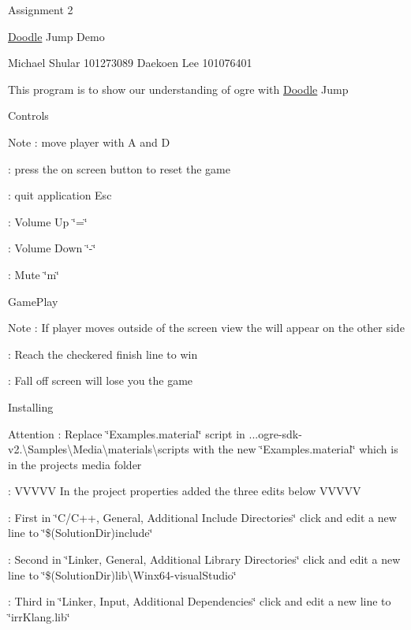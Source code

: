 Assignment 2

\mbox{\hyperlink{class_doodle}{Doodle}} Jump Demo

Michael Shular 101273089 Daekoen Lee 101076401

This program is to show our understanding of ogre with \mbox{\hyperlink{class_doodle}{Doodle}} Jump

Controls \begin{DoxyNote}{Note}
\+: move player with A and D 

\+: press the on screen button to reset the game 

\+: quit application Esc 

\+: Volume Up \char`\"{}=\char`\"{} 

\+: Volume Down \char`\"{}-\/\char`\"{} 

\+: Mute \char`\"{}m\char`\"{}
\end{DoxyNote}
Game\+Play \begin{DoxyNote}{Note}
\+: If player moves outside of the screen view the will appear on the other side 

\+: Reach the checkered finish line to win 

\+: Fall off screen will lose you the game
\end{DoxyNote}
Installing \begin{DoxyAttention}{Attention}
\+: Replace \char`\"{}\+Examples.\+material\char`\"{} script in ...ogre-\/sdk-\/v2.\textbackslash{}\+Samples\textbackslash{}\+Media\textbackslash{}materials\textbackslash{}scripts with the new \char`\"{}\+Examples.\+material\char`\"{} which is in the project\textquotesingle{}s media folder 

\+: VVVVV In the project properties added the three edits below VVVVV 

\+: First in \char`\"{}\+C/\+C++, General, Additional Include Directories\char`\"{} click and edit a new line to \char`\"{}\$(\+Solution\+Dir)include\char`\"{} 

\+: Second in \char`\"{}\+Linker, General, Additional Library Directories\char`\"{} click and edit a new line to \char`\"{}\$(\+Solution\+Dir)lib\textbackslash{}\+Winx64-\/visual\+Studio\char`\"{} 

\+: Third in \char`\"{}\+Linker, Input, Additional Dependencies\char`\"{} click and edit a new line to \char`\"{}irr\+Klang.\+lib\char`\"{} 
\end{DoxyAttention}
